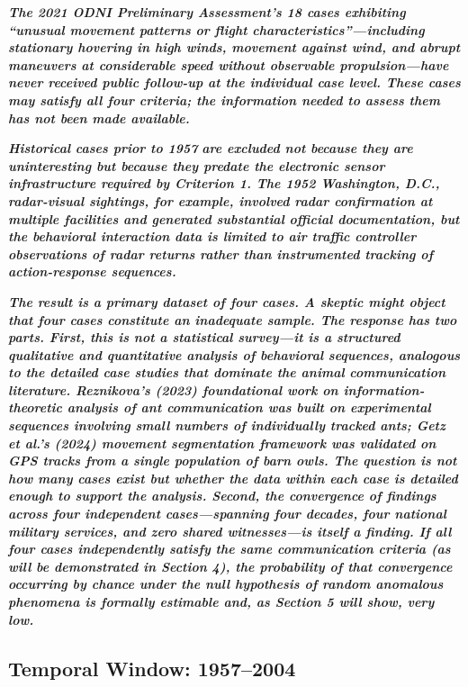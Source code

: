 \documentclass[11pt,letterpaper]{article}
\begin{document}
\textbf{\textit{The 2021 ODNI Preliminary Assessment's 18 cases exhibiting ``unusual movement patterns or flight characteristics''}}\textbf{\textit{---including stationary hovering in high winds, movement against wind, and abrupt maneuvers at considerable speed without observable propulsion---have never received public follow-up at the individual case level. These cases may satisfy all four criteria; the information needed to assess them has not been made available.}}


\textbf{\textit{Historical cases prior to 1957}}\textbf{\textit{ are excluded not because they are uninteresting but because they predate the electronic sensor infrastructure required by Criterion 1. The 1952 Washington, D.C., radar-visual sightings, for example, involved radar confirmation at multiple facilities and generated substantial official documentation, but the behavioral interaction data is limited to air traffic controller observations of radar returns rather than instrumented tracking of action-response sequences.}}


\textbf{\textit{The result is a primary dataset of four cases. A skeptic might object that four cases constitute an inadequate sample. The response has two parts. First, this is not a statistical survey---it is a structured qualitative and quantitative analysis of behavioral sequences, analogous to the detailed case studies that dominate the animal communication literature. Reznikova's (2023) foundational work on information-theoretic analysis of ant communication was built on experimental sequences involving small numbers of individually tracked ants; Getz et al.'s (2024) movement segmentation framework was validated on GPS tracks from a single population of barn owls. The question is not how many cases exist but whether the data within each case is detailed enough to support the analysis. Second, the convergence of findings across four independent cases---spanning four decades, four national military services, and zero shared witnesses---is itself a finding. If all four cases independently satisfy the same communication criteria (as will be demonstrated in Section 4), the probability of that convergence occurring by chance under the null hypothesis of random anomalous phenomena is formally estimable and, as Section 5 will show, very low.}}


\subsection{Temporal Window: 1957--2004}
\end{document}
